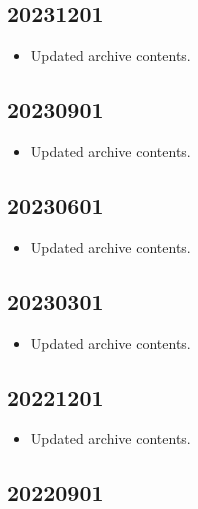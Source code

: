 \documentclass[hidelinks,a4paper,12pt]{article}
\begin{document}
\subsection{20231201}  \label{sec:changelog_20231201}

\begin{itemize}
\item Updated archive contents.
\end{itemize}

\subsection{20230901}  \label{sec:changelog_20230901}

\begin{itemize}
\item Updated archive contents.
\end{itemize}

\subsection{20230601}  \label{sec:changelog_20230601}

\begin{itemize}
\item Updated archive contents.
\end{itemize}

\subsection{20230301}  \label{sec:changelog_20230301}

\begin{itemize}
\item Updated archive contents.
\end{itemize}

\subsection{20221201}  \label{sec:changelog_20221201}

\begin{itemize}
\item Updated archive contents.
\end{itemize}

\subsection{20220901}  \label{sec:changelog_20220901}
\end{document}
